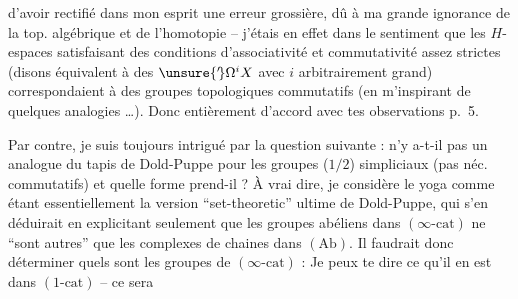 d'avoir rectifié dans mon esprit une erreur grossière, dû à ma grande ignorance de la top. algébrique et de l'homotopie -- j'étais en effet dans le sentiment que les $H$-espaces satisfaisant des conditions d'associativité et commutativité assez strictes (disons équivalent à des $\unsure{{}'\!}\Omega^{i}X$ avec $i$ arbitrairement grand) correspondaient à des groupes topologiques commutatifs (en m'inspirant de quelques analogies \dots). Donc entièrement d'accord avec tes observations p.~5.

Par contre, je suis toujours intrigué par la question suivante : n'y a-t-il pas un analogue du tapis de Dold-Puppe pour les groupes ($1/2$) simpliciaux (pas néc. commutatifs) et quelle forme prend-il ? À vrai dire, je considère le yoga
comme étant essentiellement la version ``set-theoretic'' ultime de Dold-Puppe, qui s'en déduirait en explicitant seulement que les groupes abéliens dans $(\infty\text{-cat})$ ne ``sont autres'' que les complexes de chaines dans $(\mathrm{Ab})$. Il faudrait donc déterminer quels sont les groupes de $(\infty\text{-cat})$ : Je peux te dire ce qu'il en est dans $(1\text{-cat})$ -- ce sera %
